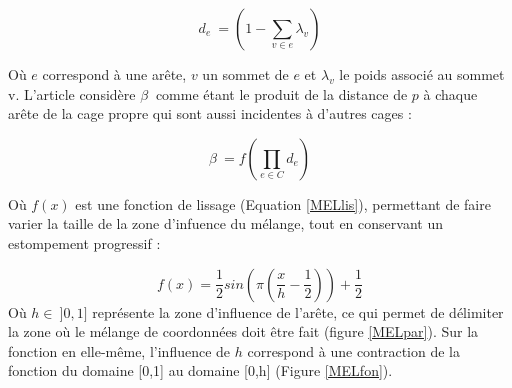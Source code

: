 \begin{equation}
  d_e~ = (1 - \sum_{v \in e} \lambda_v)
\end{equation}

Où $e$ correspond à une arête, $v$ un sommet de $e$ et $\lambda_v$ le
poids associé au sommet v. L'article considère $\beta~$ comme étant le
produit de la distance de $p$ à chaque arête de la cage propre qui
sont aussi incidentes à d'autres cages :

\begin{equation}
  \beta~ = f(\prod_{e \in C} d_e)
\end{equation}

Où $f(x)$ est une fonction de lissage (Equation \ref{MELlis}),
permettant de faire varier la taille de la zone d'infuence du mélange,
tout en conservant un estompement progressif :

\begin{equation}
  f(x) = \frac{1}{2} sin(\pi(\frac{x}{h}-\frac{1}{2})) + \frac{1}{2}
  \label{MELlis}
\end{equation}
Où $h \in~ ]0,1]$ représente la zone d'influence de l'arête, ce qui
permet de délimiter la zone où le mélange de coordonnées doit être
fait (figure \ref{MELpar}). Sur la fonction en elle-même, l'influence
de $h$ correspond à une contraction de la fonction du domaine [0,1] au
domaine [0,h] (Figure \ref{MELfon}).

